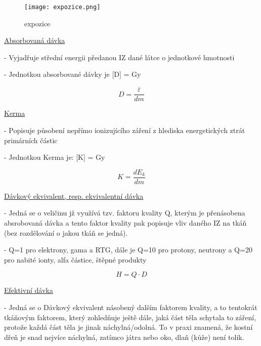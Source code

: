 \begin{figure}[ht!]
    \centering
    \texttt{[image: expozice.png]}
    \caption{expozice}
\end{figure}

\underline{Absorbovaná dávka}

- Vyjadřuje střední energii předanou IZ dané látce o jednotkové hmotnosti

- Jednotkou absorbované dávky je [D] = Gy

\begin{center}
    \begin{equation}
        D = \frac{\overline{\varepsilon}}{dm}
    \end{equation}
\end{center}

\underline{Kerma}

- Popisuje působení nepřímo ionizujícího záření z hlediska energetických ztrát primárních částic

- Jednotkou Kerma je: [K] = Gy


\begin{center}
    \begin{equation}
        K = \frac{dE_k}{dm}
    \end{equation}
\end{center}

\underline{Dávkový ekvivalent, resp. ekvivalentní dávka}

- Jedná se o veličinu jž využívá tzv. faktoru kvality Q, kterým je přenásobena absrobovaná dávka a tento faktor kvality pak popisuje vliv daného IZ na tkáň (bez rozdělování o jakou tkáň se jedná).

- Q=1 pro elektrony, gama a RTG, dále je Q=10 pro protony, neutrony a Q=20 pro nabité ionty, alfa částice, štěpné produkty

\begin{center}
\begin{equation}
    H = Q \cdot D
\end{equation}    
\end{center}


\underline{Efektivní dávka}

- Jedná se o Dávkový ekvivalent násobený dalším faktorem kvality, a to tentokrát tkáňovým faktorem, který zohledňuje ještě dále, jaká část těla schytala to záření, protože každá část těla je jinak náchylná/odolná. To v praxi znamená, že kostní dřeň je snad nejvíce náchylná, zatímco játra nebo oko, dlaň (kůže) není tolik.

